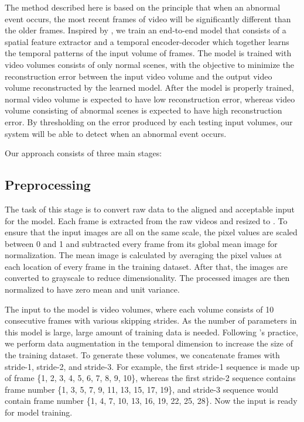 \documentclass[a4paper]{article}
\begin{document}
The method described here is based on the principle that when an abnormal event occurs, the most recent frames of video will be significantly different than the older frames. Inspired by \cite{hasan2016}, we train an end-to-end model that consists of a spatial feature extractor and a temporal encoder-decoder which together learns the temporal patterns of the input volume of frames. The model is trained with video volumes consists of only normal scenes, with the objective to minimize the reconstruction error between the input video volume and the output video volume reconstructed by the learned model. After the model is properly trained, normal video volume is expected to have low reconstruction error, whereas video volume consisting of abnormal scenes is expected to have high reconstruction error. By thresholding on the error produced by each testing input volumes, our system will be able to detect when an abnormal event occurs.

Our approach consists of three main stages:

\subsection{Preprocessing}

The task of this stage is to convert raw data to the aligned and acceptable input for the model. Each frame is extracted from the raw videos and resized to . To ensure that the input images are all on the same scale, the pixel values are scaled between 0 and 1 and subtracted every frame from its global mean image for normalization. The mean image is calculated by averaging the pixel values at each location of every frame in the training dataset. After that, the images are converted to grayscale to reduce dimensionality. The processed images are then normalized to have zero mean and unit variance. 

The input to the model is video volumes, where each volume consists of 10 consecutive frames with various skipping strides. As the number of parameters in this model is large, large amount of training data is needed. Following \cite{hasan2016}’s practice, we perform data augmentation in the temporal dimension to increase the size of the training dataset. To generate these volumes, we concatenate frames with stride-1, stride-2, and stride-3. For example, the first stride-1 sequence is made up of frame \{1, 2, 3, 4, 5, 6, 7, 8, 9, 10\}, whereas the first stride-2 sequence contains frame number \{1, 3, 5, 7, 9, 11, 13, 15, 17, 19\}, and stride-3 sequence would contain frame number \{1, 4, 7, 10, 13, 16, 19, 22, 25, 28\}. Now the input is ready for model training.
\end{document}
